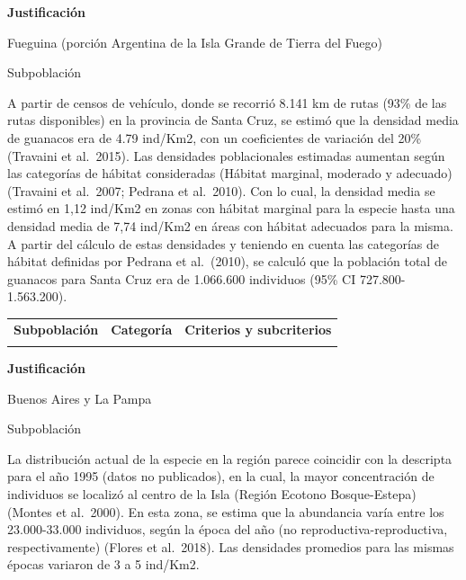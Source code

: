 \documentclass[
  x11names]{article}
\begin{document}
\textbf{Justificación}

Fueguina (porción Argentina de la Isla Grande de Tierra del Fuego)

Subpoblación

A partir de censos de vehículo, donde se recorrió 8.141 km de rutas
(93\% de las rutas disponibles) en la provincia de Santa Cruz, se estimó
que la densidad media de guanacos era de 4.79 ind/Km2, con un
coeficientes de variación del 20\% (Travaini et al.~2015). Las
densidades poblacionales estimadas aumentan según las categorías de
hábitat consideradas (Hábitat marginal, moderado y adecuado) (Travaini
et al.~2007; Pedrana et al.~2010). Con lo cual, la densidad media se
estimó en 1,12 ind/Km2 en zonas con hábitat marginal para la especie
hasta una densidad media de 7,74 ind/Km2 en áreas con hábitat adecuados
para la misma. A partir del cálculo de estas densidades y teniendo en
cuenta las categorías de hábitat definidas por Pedrana et al.~(2010), se
calculó que la población total de guanacos para Santa Cruz era de
1.066.600 individuos (95\% CI 727.800-1.563.200).\vspace{0.5cm}

\begin{tabu} to 
\toprule
\textbf{Subpoblación} & \textbf{Categoría} & \textbf{Criterios y subcriterios}\\
\midrule
{} &  & \\
\bottomrule
\end{tabu}

\textbf{Justificación}

Buenos Aires y La Pampa

Subpoblación

La distribución actual de la especie en la región parece coincidir con
la descripta para el año 1995 (datos no publicados), en la cual, la
mayor concentración de individuos se localizó al centro de la Isla
(Región Ecotono Bosque-Estepa) (Montes et al.~2000). En esta zona, se
estima que la abundancia varía entre los 23.000-33.000 individuos, según
la época del año (no reproductiva-reproductiva, respectivamente) (Flores
et al.~2018). Las densidades promedios para las mismas épocas variaron
de 3 a 5 ind/Km2.\vspace{0.5cm}
\end{document}
